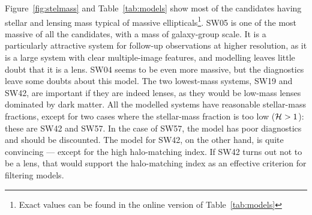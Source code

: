 Figure~\ref{fig:stelmass} and Table~\ref{tab:models} show most of the
candidates having stellar
and lensing mass typical of massive ellipticals\footnote{
  Exact values can be found in the online version of Table~\ref{tab:models}}.
SW05 is one of the
most massive of all the candidates, with a mass of galaxy-group scale.
It is a particularly attractive system for follow-up observations at
higher resolution, as it is a large system with clear multiple-image
features, and modelling leaves little doubt that it is a lens.  SW04
seems to be even more massive, but the diagnostics leave some doubts
about this model.  The two lowest-mass systems, SW19 and SW42, are
important if they are indeed lenses, as they would be low-mass lenses
dominated by dark matter.  All the modelled systems have reasonable
stellar-mass fractions, except for two cases where the stellar-mass
fraction is too low ($\mathcal{H} > 1$): these are SW42 and
SW57.  In the case of SW57, the model has poor diagnostics and should
be discounted.  The model for SW42, on the other hand, is quite
convincing --- except for the high halo-matching index.  If SW42 turns
out not to be a lens, that would support the halo-matching index as an
effective criterion for filtering models.

